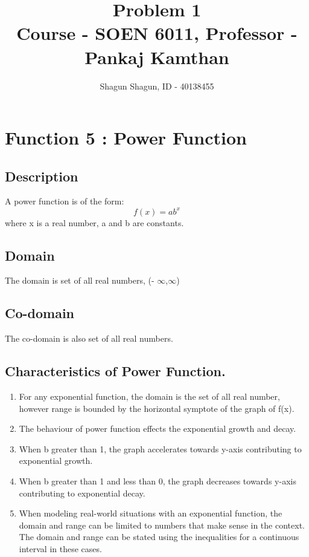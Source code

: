 \documentclass[a4paper,12pt]{article}
\title{Problem 1\\
\large Course - SOEN 6011, Professor - Pankaj Kamthan}
\author{Shagun Shagun, ID - 40138455}
\date{}
\begin{document}
\maketitle %

\section{\large Function 5 : Power Function}

\subsection{Description}
A power function is of the form:
\begin{equation} \label{Power_func}
	f(x) = ab^x
\end{equation}
where x is a real number, a and b are constants.


\subsection{Domain}
The domain is set of all real numbers,  (- $\infty$,$\infty$)

\subsection{Co-domain}
The co-domain is also set of all real numbers.


\subsection{Characteristics of Power Function.}
\begin{enumerate}
\item For any exponential function, the domain is the set of all real number, however range is bounded by the horizontal symptote of the graph of f(x).

\item The behaviour of power function effects the exponential growth and decay.
\item When b greater than 1, the graph accelerates towards y-axis contributing to exponential growth.
\item When b greater than 1 and less than 0, the graph decreases towards y-axis contributing to exponential decay.
\item When modeling real-world situations with an exponential function, the domain and range can be limited to numbers that make sense in the context. The domain and range can be stated using the inequalities for a continuous interval in these cases.

\end{enumerate}
\end{document}
